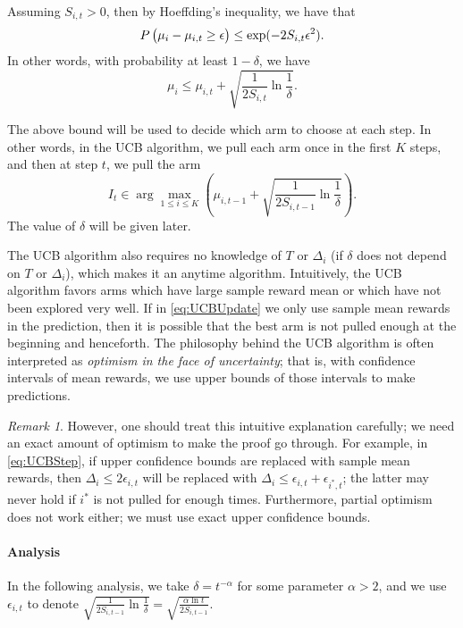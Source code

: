 \documentclass[openany]{book}
\theoremstyle{definition}
\theoremstyle{remark}
\newtheorem*{remark}{Remark}
\begin{document}
Assuming $S_{i,t}>0$, then by Hoeffding's inequality, we have that
\begin{equation*}
    P\del{\mu_i-\mu_{i,t}\ge\epsilon}\le\exp(-2S_{i,t}\epsilon^2).
\end{equation*}
In other words, with probability at least $1-\delta$, we have
\begin{equation*}
    \mu_i\le\mu_{i,t}+\sqrt{\frac{1}{2S_{i,t}}\ln \frac{1}{\delta}}.
\end{equation*}

The above bound will be used to decide which arm to choose at each step. In other words, in the UCB algorithm, we pull each arm once in the first $K$ steps, and then at step $t$, we pull the arm
\begin{equation}\label{eq:UCBUpdate}
    I_t\in\arg\max_{1\le i\le K}\left(\mu_{i,t-1}+\sqrt{\frac{1}{2S_{i,t-1}}\ln \frac{1}{\delta}}\right).
\end{equation}
The value of $\delta$ will be given later.

The UCB algorithm also requires no knowledge of $T$ or $\Delta_i$ (if $\delta$ does not depend on $T$ or $\Delta_i$), which makes it an anytime algorithm. Intuitively, the UCB algorithm favors arms which have large sample reward mean or which have not been explored very well. If in \eqref{eq:UCBUpdate} we only use sample mean rewards in the prediction, then it is possible that the best arm is not pulled enough at the beginning and henceforth. The philosophy behind the UCB algorithm is often interpreted as \emph{optimism in the face of uncertainty}; that is, with confidence intervals of mean rewards, we use upper bounds of those intervals to make predictions.
\begin{remark}
    However, one should treat this intuitive explanation carefully; we need an exact amount of optimism to make the proof go through. For example, in \eqref{eq:UCBStep}, if upper confidence bounds are replaced with sample mean rewards, then $\Delta_i\le2\epsilon_{i,t}$ will be replaced with $\Delta_i\le\epsilon_{i,t}+\epsilon_{i^*,t}$; the latter may never hold if $i^*$ is not pulled for enough times. Furthermore, partial optimism does not work either; we must use exact upper confidence bounds.
\end{remark}

\paragraph{Analysis}
In the following analysis, we take $\delta=t^{-\alpha}$ for some parameter $\alpha>2$, and we use $\epsilon_{i,t}$ to denote $\sqrt{\frac{1}{2S_{i,t-1}}\ln \frac{1}{\delta}}=\sqrt{\frac{\alpha\ln t}{2S_{i,t-1}}}$.
\end{document}
